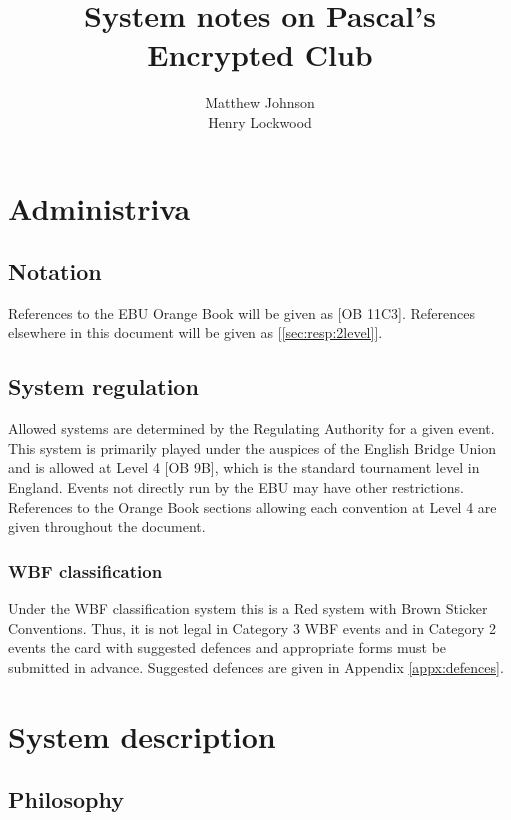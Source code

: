 \documentclass[a4paper,14pt]{extarticle}
\author{Matthew Johnson\\Henry Lockwood}
\title{System notes on Pascal's Encrypted Club}
\begin{document}
\newcommand{\orange}[1]{[OB #1]}
\newcommand{\xref}[1]{[\ref{#1}]}

\maketitle
\tableofcontents

\section{Administriva}
\label{sec:admin}

\subsection{Notation}
\label{sec:notation}

References to the EBU Orange Book will be given as \orange{11C3}. References
elsewhere in this document will be given as \xref{sec:resp:2level}.

\subsection{System regulation}

Allowed systems are determined by the Regulating Authority for a given event.
This system is primarily played under the auspices of the English Bridge Union
and is allowed at Level 4 \orange{9B}, which is the standard tournament level
in England. Events not directly run by the EBU may have other restrictions.
References to the Orange Book sections allowing each convention at Level 4 are
given throughout the document.

\subsubsection{WBF classification}

Under the WBF classification system this is a Red system with Brown Sticker
Conventions. Thus, it is not legal in Category 3 WBF events and in Category 2
events the card with suggested defences and appropriate forms must be submitted
in advance. Suggested defences are given in Appendix \ref{appx:defences}.

\newpage

\section{System description}
\label{sec:system}

\subsection{Philosophy}
\label{sec:philosophy}
\end{document}
